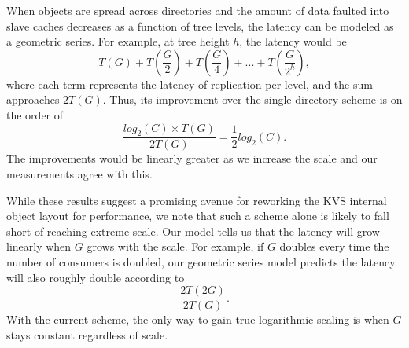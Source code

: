 When objects are spread across directories and the amount of data
faulted into slave caches decreases as a function of tree levels, 
the latency can be modeled as a geometric series.
For example, at tree height $h$, the latency would be 
\begin{equation}
T(G) + T(\frac{G}{2}) + T(\frac{G}{4}) + ... + T(\frac{G}{2^h}),
\end{equation}
where each term represents the latency of replication per level,
and the sum approaches $2T(G)$. Thus, its improvement over the single
directory scheme is on the order of 
\begin{equation}
\frac{log_2(C) \times T(G)}{2 T(G)} = \frac{1}{2}log_2(C).
\end{equation}
The improvements would be linearly 
greater as we increase the scale and our measurements agree with this. 

While these results suggest a promising avenue for reworking the KVS internal
object layout for performance, we note that such a scheme alone
is likely to fall short of reaching extreme scale.
Our model tells us that the latency will grow linearly when $G$ grows
with the scale.   For example, if $G$ doubles every time the number of
consumers is doubled, our geometric series model predicts the latency will
also roughly double according to
\begin{equation}
\frac{2T(2G)}{2T(G)}.
\end{equation}
With the current scheme, the only way to gain true logarithmic
scaling is when $G$ stays constant regardless of scale. 
